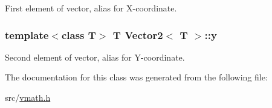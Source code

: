 First element of vector, alias for X-\/coordinate. 

\hypertarget{class_vector2_a6cfed8355591aa269f4dba43bd806ef9}{
\subsubsection[{y}]{\setlength{\rightskip}{0pt plus 5cm}template$<$class T$>$ T {\bf Vector2}$<$ T $>$::{\bf y}}}
\label{class_vector2_a6cfed8355591aa269f4dba43bd806ef9}


Second element of vector, alias for Y-\/coordinate. 



The documentation for this class was generated from the following file:\begin{DoxyCompactItemize}
\item 
src/\hyperlink{vmath_8h}{vmath.h}\end{DoxyCompactItemize}
